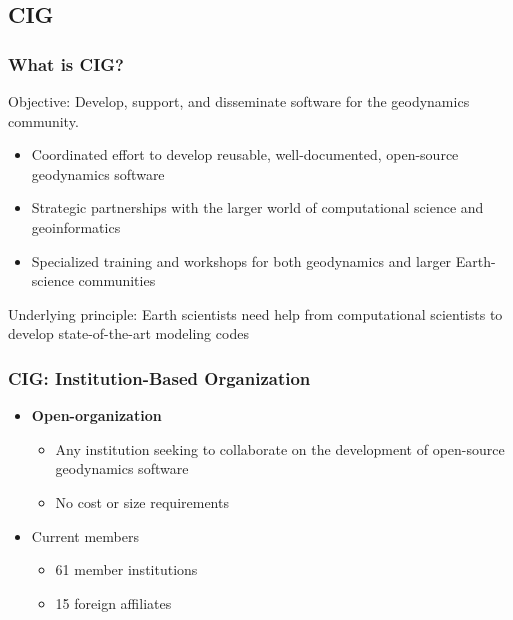 \documentclass[aspectratio=169]{beamer}
\begin{document}
\subsection{CIG}

\begin{frame}
  \frametitle{What is CIG?}
 
  \vfill

  Objective: Develop, support, and disseminate software for the
  geodynamics community.

  \vfill

  \begin{itemize}
  \item Coordinated effort to develop reusable, well-documented,
    open-source geodynamics software
  \item Strategic partnerships with the larger world of
    computational science and geoinformatics
  \item Specialized training and workshops for both geodynamics and
    larger Earth-science communities
  \end{itemize}

  \vfill
 
  Underlying principle: Earth scientists need help from computational
  scientists to develop state-of-the-art modeling codes

\end{frame}


\begin{frame}
  \frametitle{CIG: Institution-Based Organization}
 
  \begin{itemize}
  \item {\bf Open-organization}
    \begin{itemize}
    \item Any institution seeking to collaborate on the development of
      open-source geodynamics software
    \item No cost or size requirements
    \end{itemize}
  \item Current members
    \begin{itemize}
    \item 61 member institutions
    \item 15 foreign affiliates
    \end{itemize}
 \end{itemize}
\end{frame}
\end{document}
